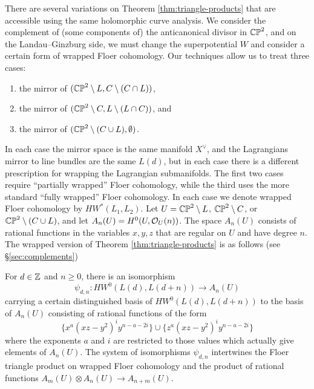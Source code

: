 \documentclass[12pt]{amsart}
\begin{document}
There are several variations on Theorem \ref{thm:triangle-products} that
are accessible using the same holomorphic curve analysis. We consider
the complement of (some components of) the anticanonical divisor in
$\mathbb{CP}^2$, and on the Landau--Ginzburg side, we must change the
superpotential $W$ and consider a certain form of wrapped Floer
cohomology. Our techniques allow us to treat three cases:
\begin{enumerate}
\item the mirror of $(\mathbb{CP}^2 \setminus L, C \setminus (C\cap L))$,
\item the mirror of $(\mathbb{CP}^2 \setminus C, L \setminus (L\cap C))$, and 
\item the mirror of $(\mathbb{CP}^2 \setminus (C\cup L), \emptyset)$.
\end{enumerate}
In each case the mirror space is the same manifold $X^\vee$, and the
Lagrangians mirror to line bundles are the same $L(d)$, but in each
case there is a different prescription for wrapping the Lagrangian
submanifolds. The first two cases require ``partially wrapped'' Floer
cohomology, while the third uses the more standard ``fully wrapped''
Floer cohomology. In each case we denote wrapped Floer cohomology by
$HW^*(L_1,L_2)$.  Let $U = \mathbb{CP}^2 \setminus L$, $\mathbb{CP}^2 \setminus C$, or
$\mathbb{CP}^2 \setminus (C\cup L)$, and let $A_n(U) = H^0(U,\mathcal{O}_U(n))$. The
space $A_n(U)$ consists of rational functions in the variables
$x,y,z$ that are regular on $U$ and have degree $n$. The wrapped version of Theorem
\ref{thm:triangle-products} is as follows (see
\S\ref{sec:complements})
\begin{theorem}
  \label{thm:wrapped-products}
  
  For $d \in \mathbb{Z}$ and $n \geq 0$, there is an isomorphism
  \begin{equation}
    \psi_{d,n} : HW^0(L(d),L(d+n)) \to A_n(U)
  \end{equation}
  carrying a certain distinguished basis of $HW^0(L(d),L(d+n))$ to the
  basis of $A_n(U)$ consisting of rational functions of the form 
  \begin{equation}
    \{x^a(xz-y^2)^iy^{n-a-2i}\} \cup
    \{z^a(xz-y^2)^iy^{n-a-2i}\}
  \end{equation}
  where the exponents $a$ and $i$ are restricted to those values which
  actually give elements of $A_n(U)$. The system of isomorphisms
  $\psi_{d,n}$ intertwines the Floer triangle product on wrapped Floer
  cohomology and the product of rational functions $A_m(U) \otimes A_n(U) \to
  A_{n+m}(U)$.
\end{theorem}
\end{document}
